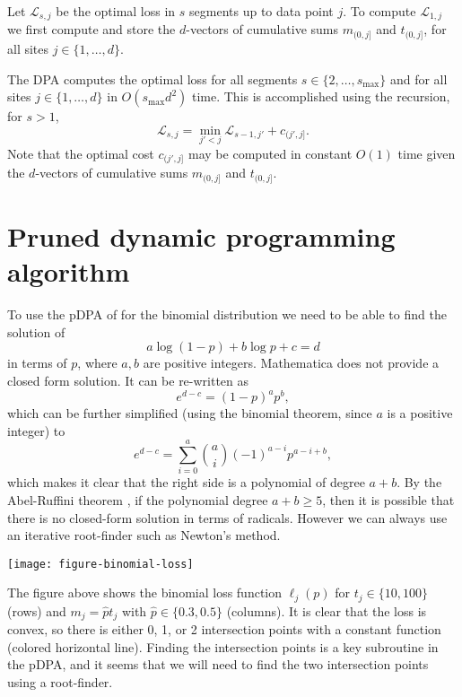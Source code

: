 \documentclass[12pt]{article}
\begin{document}
Let $\mathcal L_{s,j}$ be the optimal loss in $s$ segments up to data
point $j$. To compute $\mathcal L_{1, j}$ we first compute and store
the $d$-vectors of cumulative sums $m_{(0, j]}$ and $t_{(0, j]}$, for
all sites $j\in\{1, \dots, d\}$.

The DPA computes the optimal loss for all segments $s\in\{2, \dots,
s_{\text{max}} \}$ and for all sites $j\in\{1, \dots, d\}$ in
$O(s_{\text{max}} d^2)$ time. This is accomplished using the
recursion, for $s>1$,
\begin{equation}
  \label{eq:dpa-recursion}
  \mathcal L_{s, j} = 
  \min_{j' < j}
  \mathcal L_{s-1, j'}
  + 
  c_{(j', j]}.
\end{equation}
Note that the optimal cost $c_{(j', j]}$ may be computed in constant
$O(1)$ time given the $d$-vectors of cumulative sums $m_{(0, j]}$ and
$t_{(0, j]}$.

\section{Pruned dynamic programming algorithm}

To use the pDPA of \citet{pruned-dp} for the binomial distribution we
need to be able to find the solution of
\begin{equation}
  \label{eq:pDPA-intervals}
  a \log(1-p) + b \log p + c = d
\end{equation}
in terms of $p$, where $a,b$ are positive integers. Mathematica does
not provide a closed form solution. It can be re-written as
\begin{equation}
  \label{eq:pDPA-interval-factorized}
  e^{d-c} = (1-p)^a p^b,
\end{equation}
which can be further simplified (using the binomial theorem, since $a$
is a positive integer) to
\begin{equation}
  \label{eq:pDPA-interval-polynomial}
  e^{d-c} = \sum_{i=0}^a \binom{a}{i} (-1)^{a-i} p^{a-i+b},
\end{equation}
which makes it clear that the right side is a polynomial of degree
$a+b$. By the Abel-Ruffini theorem \citep{Abel-Ruffini-wikipedia}, if
the polynomial degree $a+b\geq 5$, then it is possible that there is
no closed-form solution in terms of radicals. However we can always
use an iterative root-finder such as Newton's method.

\texttt{[image: figure-binomial-loss]}

The figure above shows the binomial loss function $\ell_j(p)$ for
$t_j\in\{10, 100\}$ (rows) and $m_j=\hat p t_j$ with $\hat p\in\{0.3,
0.5\}$ (columns). It is clear that the loss is convex, so there is
either 0, 1, or 2 intersection points with a constant function
(colored horizontal line). Finding the intersection points is a key
subroutine in the pDPA, and it seems that we will need to find the two
intersection points using a root-finder.




\end{document}
